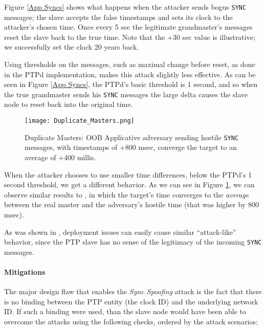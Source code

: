\documentclass[11pt]{article}
\begin{document}
Figure \ref{App Syncs} shows what happens when the attacker sends bogus \texttt{SYNC} messages; the slave accepts the false timestamps and sets its clock to the attacker's chosen time. Once every 5 sec the legitimate grandmaster's messages reset the slave back to the true time. Note that the +30 sec value is illustrative; we successfully set the clock 20 years back.

Using thresholds on the messages, such as maximal change before reset, as done in the PTPd implementation, makes this attack slightly less effective. As can be seen in Figure \ref{App Syncs}, the PTPd's basic threshold is 1 second, and so when the true grandmaster sends his \texttt{SYNC} messages the large delta causes the slave node to reset back into the original time.



\begin{figure}[t]

\centerline{\texttt{[image: Duplicate\_Masters.png]}}

\caption{Duplicate Masters: OOB Applicative adversary sending hostile \texttt{SYNC} messages, with timestamps of +800 msec, converge the target to an average of +400 millis.}

\label{Dup Masters}

\end{figure}



When the attacker chooses to use smaller time differences, below the PTPd's 1 second threshold, we get a different behavior. As we can see in Figure \ref{Dup Masters}, we can observe similar results to \cite{Delay}, in which the target's time converges to the \emph{average} between the real master and the adversary's hostile time (that was higher by 800 msec).



As was shown in \cite{first_deploy}, deployment issues can easily cause similar ``attack-like'' behavior, since the PTP slave has no sense of the legitimacy of the incoming \texttt{SYNC} messages.



\paragraph{Mitigations}\label{time:scenrio2mit}

The major design flaw that enables the \emph{Sync Spoofing} attack is the fact that there is no binding between the PTP entity (the clock ID) and the underlying network ID. If such a binding were used, than the slave node would have been able to overcome the attacks using the following checks, ordered by the attack scenarios:
\end{document}
